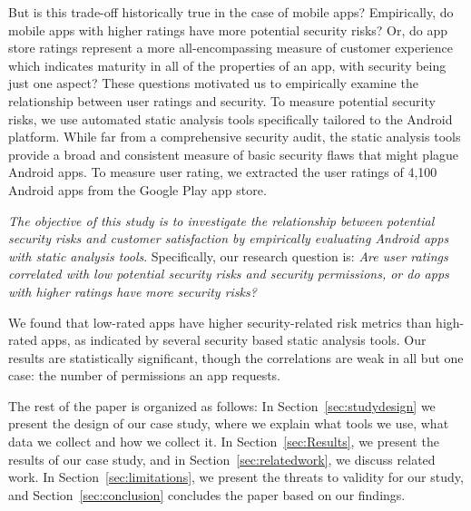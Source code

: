 \documentclass{sig-alternate-05-2015}
\newcommand{\todo}[1]{\textcolor{cyan}{\textbf{[#1]}}}
\begin{document}
But is this trade-off historically true in the case of mobile apps? Empirically, do mobile apps with higher ratings have more potential security risks? Or, do app store ratings represent a more all-encompassing measure of customer experience which indicates maturity in all of the properties of an app, with security being just one aspect? These questions motivated us to empirically examine the relationship between user ratings and security. To measure potential security risks, we use automated static analysis tools specifically tailored to the Android platform. While far from a comprehensive security audit, the static analysis tools provide a broad and consistent measure of basic security flaws that might plague Android apps. To measure user rating, we extracted the user ratings of 4,100 Android apps from the Google Play app store.

\emph{The objective of this study is to investigate the relationship between potential security risks and customer satisfaction by empirically evaluating Android apps with static analysis tools}. Specifically, our research question is: \textit{Are user ratings correlated with low potential security risks and security permissions, or do apps with higher ratings have more security risks?}


We found that low-rated apps have higher security-related risk metrics than high-rated apps, as indicated by several security based static analysis tools. Our results are statistically significant, though the correlations are weak in all but one case: the number of permissions an app requests.



The rest of the paper is organized as follows: In Section~\ref{sec:studydesign} we present the design of our case study, where we explain what tools we use, what data we collect and how we collect it. In Section~\ref{sec:Results}, we present the results of our case study, and in Section~\ref{sec:relatedwork}, we discuss related work. In Section~\ref{sec:limitations}, we present the threats to validity for our study, and Section~\ref{sec:conclusion} concludes the paper based on our findings.
\end{document}
